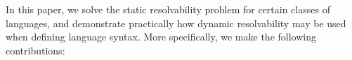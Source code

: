 \documentclass[acmsmall,review,anonymous]{acmart}\settopmatter{printfolios=true,printccs=false,printacmref=false}
\begin{document}



In this paper, we solve the static resolvability problem for certain classes of languages, and demonstrate practically how dynamic resolvability may be used when defining language syntax. More specifically, we make the following contributions:
\end{document}
